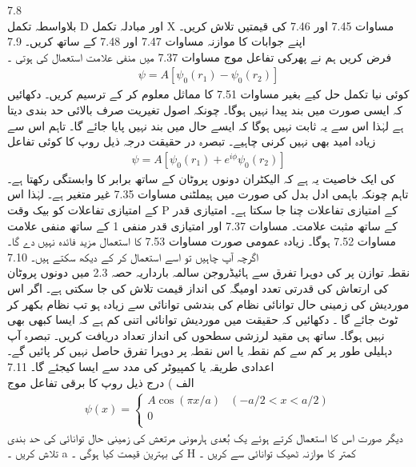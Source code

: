 7.8\\
بلاواسطہ تکمل D اور مبادلہ تکمل X مساوات 7.45 اور 7.46 کی قیمتیں تلاش کریں۔ اپنے جوابات کا موازنہ مساوات 7.47 اور 7.48 کے ساتھ کریں۔ 
7.9\\
فرض کریں ہم نے پھرکی تفاعل موج مساوات 7.37 میں منفی علامت استعمال کی ہوتی ۔
\begin{align}
\psi=A[\psi_{0}(r_{1})-\psi_{0}(r_{2})]
\end{align}
 کوئی نیا تکمل حل کیے بغیر مساوات 7.51 کا مماثل  معلوم کر کے ترسیم کریں۔ دکھائیں کہ ایسی صورت میں بند پیدا نہیں ہوگا۔ چونکہ اصول تغیریت صرف بالائی حد بندی دیتا ہے لہٰذا اس سے یہ ثابت نہیں ہوگا کہ ایسے حال میں بند نہیں پایا جائے گا۔ تاہم اس سے زیادہ امید بھی نہیں کرنی چاہیے۔ تبصرہ در حقیقت درجہ ذیل روپ کا کوئی تفاعل 
\begin{align}
\psi=A[\psi_{0}(r_{1})+e^{i\phi}\psi_{0}(r_{2})]
\end{align}
 کی ایک خاصیت یہ ہے کہ الیکٹران دونوں پروٹان کے ساتھ برابر کا وابستگی رکھتا ہے۔ تاہم چونکہ باہمی ادل بدل   کی صورت میں ہیملٹنی مساوات 7.35 غیر متغیر ہے۔ لہٰذا اس کے امتیازی تفاعلات کو بیک وقت P کے امتیازی تفاعلات چنا جا سکتا ہے۔ امتیازی قدر  کے ساتھ مثبت علامت۔ مساوات 7.37 اور امتیازی قدر منفی 1 کے ساتھ منفی علامت مساوات 7.52 ہوگا۔ زیادہ عمومی صورت مساوات 7.53 کا استعمال مزید فائدہ نہیں دے گا۔ اگرچہ آپ چاہیں تو اسے استعمال کر کے دیکھ سکتے ہیں۔
7.10\\
نقطہ توازن پر   کی دوہرا تفرق سے ہائیڈروجن سالمہ بارداریہ حصہ 2.3 میں دونوں پروٹان کی ارتعاش کی قدرتی تعدد اومیگہ کی انداز قیمت تلاش کی جا سکتی ہے۔ اگر اس موردیش کی زمینی حال توانائی     نظام کی بندشی توانائی سے زیادہ ہو تب نظام بکھر کر ٹوٹ جائے گا ۔ دکھائیں کہ حقیقت میں موردیش توانائی اتنی کم ہے کہ ایسا کبھی بھی نہیں ہوگا۔ ساتھ ہی مقید لرزشی سطحوں کی انداز تعداد دریافت کریں۔ تبصرہ 
آپ دہلیلی طور پر کم سے کم نقطہ یا اس نقطہ پر دوہرا تفرق حاصل نہیں کر پائیں گے۔ اعدادی طریقہ یا کمپیوٹر کی مدد سے ایسا کیجئے گا۔
7.11\\
الف ) درج ذیل روپ کا برقی تفاعل موج
\begin{align}
\psi(x)=\begin{cases} A\cos{(\pi x/a)} & (-a/2<x<a/2)\\
0\\
\end{cases} 
\end{align}
 دیگر صورت
اس کا استعمال کرتے ہوئے یک بُعدی ہارمونی مرتعش کی زمینی حال توانائی کی حد بندی تلاش کریں ۔ a کی بہترین قیمت کیا ہوگی ۔ H کمتر کا موازنہ ٹھیک توانائی سے کریں ۔
